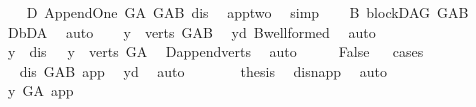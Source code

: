 \begin{isabellebody}
\ \ \isamarkupfalse%
\ D{}{\isacharcolon}{\kern0pt}\ Append{\isacharunderscore}{\kern0pt}One\ G{\isacharunderscore}{\kern0pt}A\ G{\isacharunderscore}{\kern0pt}AB\ dis\ \isamarkupfalse%
\ app{\isacharunderscore}{\kern0pt}two\ \isamarkupfalse%
\ simp\isanewline
\ \ \isamarkupfalse%
\ B{}{\isacharcolon}{\kern0pt}\ blockDAG\ G{\isacharunderscore}{\kern0pt}AB\ \isamarkupfalse%
\ D{}{\isachardot}{\kern0pt}bD{\isacharunderscore}{\kern0pt}A\ \isamarkupfalse%
\ auto\isanewline
\ \ \isamarkupfalse%
\ {\isachardoublequoteopen}y\ {\isasymin}\ verts\ G{\isacharunderscore}{\kern0pt}AB{\isachardoublequoteclose}\ \isamarkupfalse%
\ y{\isacharunderscore}{\kern0pt}d\ B{}{\isachardot}{\kern0pt}wellformed\ \isamarkupfalse%
\ auto\isanewline
\ \ \isamarkupfalse%
\ \isamarkupfalse%
\ {\isachardoublequoteopen}y\ {\isacharequal}{\kern0pt}\ dis{\isachardoublequoteclose}\ {\isacharbar}{\kern0pt}\ \ {\isachardoublequoteopen}y\ {\isasymin}\ verts\ G{\isacharunderscore}{\kern0pt}A{\isachardoublequoteclose}\ \isamarkupfalse%
\ D{}{\isachardot}{\kern0pt}append{\isacharunderscore}{\kern0pt}verts\ \isamarkupfalse%
\ auto\isanewline
\ \ \isamarkupfalse%
\ \isamarkupfalse%
\ False\isanewline
\ \ \isamarkupfalse%
{\isacharparenleft}{\kern0pt}cases{\isacharparenright}{\kern0pt}\isanewline
\ \ \ \ \isamarkupfalse%
\ {}\isanewline
\ \ \ \ \isamarkupfalse%
\ \isamarkupfalse%
\ {\isachardoublequoteopen}dis\ {\isasymrightarrow}\isactrlbsub G{\isacharunderscore}{\kern0pt}AB\isactrlesub \ app{\isachardoublequoteclose}\ \isamarkupfalse%
\ y{\isacharunderscore}{\kern0pt}d\ \isamarkupfalse%
\ auto\isanewline
\ \ \ \ \isamarkupfalse%
\ \isamarkupfalse%
\ {\isacharquery}{\kern0pt}thesis\ \isamarkupfalse%
\ dis{\isacharunderscore}{\kern0pt}n{\isacharunderscore}{\kern0pt}app\ \isamarkupfalse%
\ auto\isanewline
\ \ \isamarkupfalse%
\isanewline
\ \ \ \ \isamarkupfalse%
\ {}\isanewline
\ \ \ \ \isamarkupfalse%
\ \isamarkupfalse%
\ {\isachardoublequoteopen}y\ {\isasymrightarrow}\isactrlsup {\isacharplus}{\kern0pt}\isactrlbsub G{\isacharunderscore}{\kern0pt}A\isactrlesub \ app{\isachardoublequoteclose}\ \isamarkupfalse%

\end{isabellebody}
